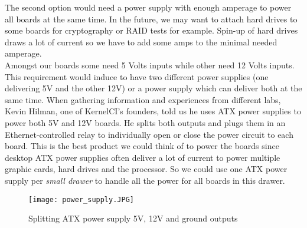 The second option would need a power supply with enough amperage to power all boards at the same time. In the future, we may want to attach hard drives to some boards for cryptography or RAID tests for example. Spin-up of hard drives draws a lot of current so we have to add some amps to the minimal needed amperage.\\
Amongst our boards some need 5 Volts inputs while other need 12 Volts inputs. This requirement would induce to have two different power supplies (one delivering 5V and the other 12V) or a power supply which can deliver both at the same time. When gathering information and experiences from different labs, Kevin Hilman, one of KernelCI's founders, told us he uses ATX power supplies to power both 5V and 12V boards. He splits both outputs and plugs them in an Ethernet-controlled relay to individually open or close the power circuit to each board. This is the best product we could think of to power the boards since desktop ATX power supplies often deliver a lot of current to power multiple graphic cards, hard drives and the processor. So we could use one ATX power supply per \textit{small drawer} to handle all the power for all boards in this drawer.

\begin{figure}[H]
  \texttt{[image: power\_supply.JPG]}
  \caption{Splitting ATX power supply 5V, 12V and ground outputs}
\end{figure}

